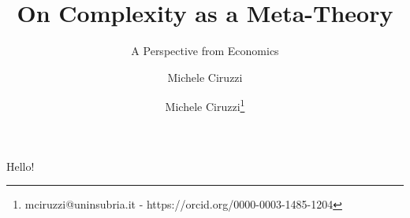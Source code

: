 \documentclass[a4paper, headings=standardclasses]{scrartcl}
\title{On Complexity as a Meta-Theory}
\subtitle{A Perspective from Economics}
\author{Michele Ciruzzi}
\author[1]{Michele Ciruzzi\thanks{mciruzzi@uninsubria.it - https://orcid.org/0000-0003-1485-1204}}
\begin{document}
	
	\maketitle
	
	
	\section{}
	Hello!
\end{document}
